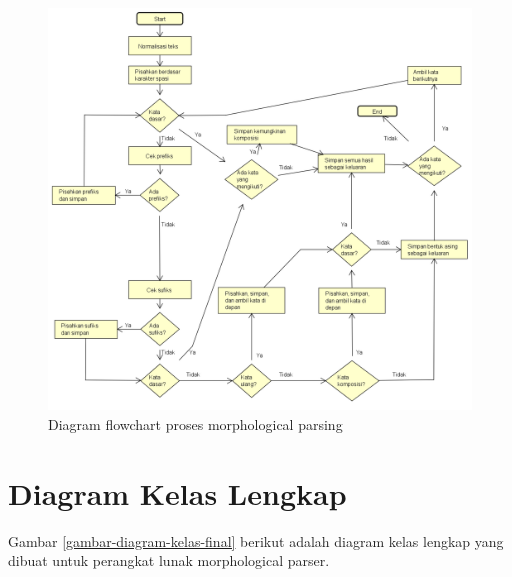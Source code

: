 \begin{figure}[H]
\centering
\includegraphics[scale=0.4]{Gambar/gambar-diagram-flowchart}
\caption{Diagram flowchart proses morphological parsing} 
\label{gambar-diagram-flowchart}
\end{figure}

\section{Diagram Kelas Lengkap}
\label{sec:DiagramKelasLengkap}

Gambar \ref{gambar-diagram-kelas-final} berikut adalah diagram kelas lengkap yang dibuat untuk perangkat lunak morphological parser.

